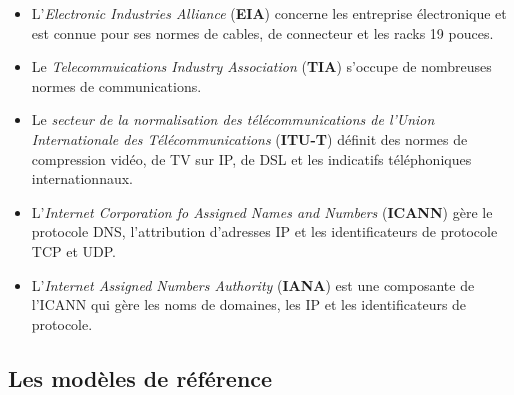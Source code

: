 \begin{itemize}
	 \item L'\textit{Electronic Industries Alliance} (\textbf{EIA}) concerne les entreprise électronique et est connue pour ses normes de cables, de connecteur et les racks 19 pouces.
	 \item Le \textit{Telecommuications Industry Association} (\textbf{TIA}) s'occupe de nombreuses normes de communications.
	 \item Le \textit{secteur de la normalisation des télécommunications de l'Union Internationale des Télécommunications} (\textbf{ITU-T}) définit des normes de compression vidéo, de TV sur IP, de DSL et les indicatifs téléphoniques internationnaux.
	 \item L'\textit{Internet Corporation fo Assigned Names and Numbers} (\textbf{ICANN}) gère le protocole DNS, l'attribution d'adresses IP et les identificateurs de protocole TCP et UDP\@.
	 \item L'\textit{Internet Assigned Numbers Authority} (\textbf{IANA}) est une composante de l'ICANN qui gère les noms de domaines, les IP et les identificateurs de protocole.
 \end{itemize}

 \subsection{Les modèles de référence}



